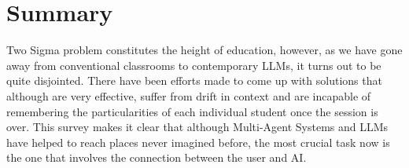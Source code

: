 \chapter{Summary}

Two Sigma problem constitutes the height of education, however, as we have gone away from conventional classrooms to contemporary LLMs, it turns out to be quite disjointed. There have been efforts made to come up with solutions that although are very effective, suffer from drift in context and are incapable of remembering the particularities of each individual student once the session is over. This survey makes it clear that although Multi-Agent Systems and LLMs have helped to reach places never imagined before, the most crucial task now is the one that involves the connection between the user and AI.